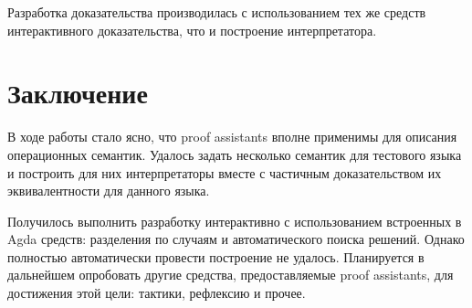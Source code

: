\documentclass[aps,12pt,final,oneside,onecolumn,musixtex,superscriptaddress,centertags]{article}
\begin{document}
  Разработка доказательства производилась с использованием тех же средств интерактивного доказательства, что и построение интерпретатора.

  \newpage
  \section*{Заключение}

  В ходе работы стало ясно, что proof assistants вполне применимы для описания операционных семантик. Удалось задать несколько семантик для тестового языка и построить для них интерпретаторы вместе с частичным доказательством их эквивалентности для данного языка.

  Получилось выполнить разработку интерактивно с использованием встроенных в Agda средств: разделения по случаям и автоматического поиска решений. Однако полностью автоматически провести построение не удалось. Планируется в дальнейшем опробовать другие средства, предоставляемые proof assistants, для достижения этой цели: тактики, рефлексию и прочее.

  \newpage
  
  
\end{document}
